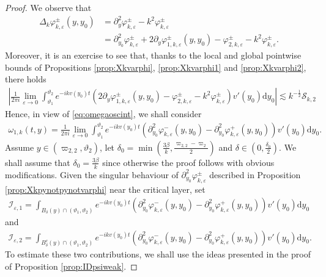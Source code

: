 \documentclass[11pt,reqno]{amsproc}
\theoremstyle{definition}
\numberwithin{equation}{section}
\newcommand{\cI}{{\mathcal I}}
\newcommand{\cS}{{\mathcal S}}
\renewcommand{\d}{\mathrm{d}}
\newcommand{\ep}{\varepsilon}
\begin{document}
\begin{proof}
We observe that 
\begin{align*}
\Delta_k\varphi_{k,\ep}^\pm(y,y_0) &= \partial_y^2\varphi_{k,\ep}^\pm - k^2\varphi_{k,\ep}^\pm \\
&= \partial_{y_0}^2\varphi_{k,\ep}^\pm + 2\partial_y\varphi_{1,k,\ep}^\pm(y,y_0) - \varphi_{2,k,\ep}^\pm - k^2\varphi_{k,\ep}^\pm.
\end{align*}
Moreover, it is an exercise to see that, thanks to the local and global pointwise bounds of Propositions \ref{prop:Xkvarphi}, \ref{prop:Xkvarphi1} and \ref{prop:Xkvarphi2}, there holds
\begin{align*}
\left| \frac{1}{2\pi i}\lim_{\ep\rightarrow 0} \int_{\vartheta_1}^{\vartheta_2} e^{-ikv(y_0)t}\left( 2\partial_y\varphi_{1,k,\ep}^\pm(y,y_0) - \varphi_{2,k,\ep}^\pm - k^2\varphi_{k,\ep}^\pm \right) v'(y_0) \d y_0 \right| \lesssim k^{-\frac12}\cS_{k,2}
\end{align*}
Hence, in view of \eqref{eq:omegaoscint}, we shall consider 
\begin{align*}
\omega_{1,k}(t,y) = \frac{1}{2\pi i}\lim_{\ep\rightarrow 0} \int_{\vartheta_1}^{\vartheta_2} e^{-ikv(y_0)t}\left( \partial_{y_0}^2\varphi_{k,\ep}^-(y,y_0) - \partial_{y_0}^2\varphi_{k,\ep}^+(y,y_0) \right) v'(y_0) \d y_0.
\end{align*}
Assume $y\in (\varpi_{2,2},\vartheta_2)$, let $\delta_0=\min\left( \frac{3\beta}{k}, \frac{\varpi_{2,2}-\varpi_2}{2}\right) $ and $\delta\in (0,\frac{\delta_0}{2})$. We shall assume that $\delta_0=\frac{3\beta}{k}$ since otherwise the proof follows with obvious modifications. Given the singular behaviour of $\partial_{y_0}^2\varphi_{k,\ep}^\pm$ described in Proposition \ref{prop:Xkpynotpynotvarphi} near the critical layer, set
\begin{align*}
\cI_{\ep,1} = \int_{B_\delta(y)\cap(\vartheta_1,\vartheta_2)} e^{-ikv(y_0)t}\left( \partial_{y_0}^2\varphi_{k,\ep}^-(y,y_0) - \partial_{y_0}^2\varphi_{k,\ep}^+(y,y_0) \right) v'(y_0) \d y_0
\end{align*}
and
\begin{align*}
\cI_{\ep,2} = \int_{B_\delta^c(y)\cap(\vartheta_1,\vartheta_2)} e^{-ikv(y_0)t}\left( \partial_{y_0}^2\varphi_{k,\ep}^-(y,y_0) - \partial_{y_0}^2\varphi_{k,\ep}^+(y,y_0) \right) v'(y_0) \d y_0.
\end{align*}
To estimate these two contributions, we shall use the ideas presented in the proof of Proposition \ref{prop:IDpsiweak}. 


\end{proof}
\end{document}
